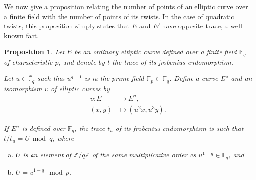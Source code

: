 \documentclass[12pt]{article}
\theoremstyle{plain}
\newtheorem{proposition}[theorem]{Proposition}
\theoremstyle{definition}
\def\Z{\ensuremath{\mathbb{Z}}}
\def\F{\ensuremath{\mathbb{F}}}
\begin{document}
We now give a proposition relating the number of points of an elliptic
curve over a finite field with the number of points of its twists.  In
the case of quadratic twists, this proposition simply states that $E$
and $E'$ have opposite trace, a well known fact.

\begin{proposition}
  \label{proposition:twisttrace}
  Let $E$ be an ordinary elliptic curve defined over a finite field
  $\F_q$ of characteristic $p$, and denote by $t$ the trace of its
  frobenius endomorphism.

  Let $u\in\bar{\F}_q$ such that $u^{q-1}$ is in the prime field
  $\F_p\subset\F_q$. Define a curve $E^u$ and an isomorphism
  $\upsilon$ of elliptic curves by
  \begin{equation*}
    \begin{aligned}
      \upsilon : E &\to E^u,\\
      (x,y) &\mapsto (u^2x,u^3y).
    \end{aligned}
  \end{equation*}
  
  If $E^u$ is defined over $\F_q$, the trace $t_u$ of its frobenius
  endomorphism is such that $t/t_u=U\bmod q$, where
  \begin{enumerate}[a)]
  \item $U$ is an element of $\Z/q\Z$ of the same multiplicative order
    as $u^{1-q}\in\F_q$, and
  \item $U=u^{1-q}\mod p$.
  \end{enumerate}
\end{proposition}
\end{document}
